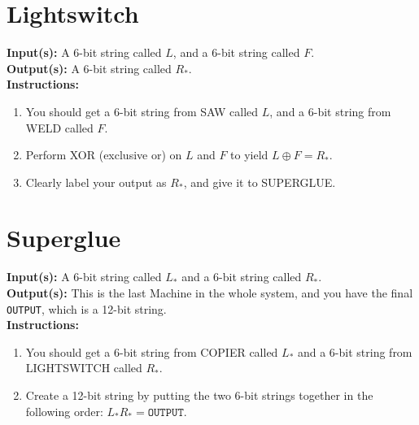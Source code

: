 \documentclass[12pt]{amsart}
\theoremstyle{plain}
\theoremstyle{definition}
\theoremstyle{remark}
\begin{document}
\newpage
\section*{Lightswitch}
\textbf{Input(s):}  A 6-bit string called $L$, and a 6-bit string called $F$.\\

\textbf{Output(s):} A 6-bit string called $R_*$.\\

\textbf{Instructions:}
\begin{enumerate}[1.]
	\item You should get a 6-bit string from SAW called $L$, and a 6-bit string from WELD called $F$.
	\item Perform XOR (exclusive or) on $L$ and $F$ to yield $L\oplus F = R_*$.
	\item Clearly label your output as $R_*$, and give it to SUPERGLUE.
\end{enumerate}

\newpage
\section*{Superglue}
\textbf{Input(s):}  A 6-bit string called $L_*$ and a 6-bit string called $R_*$.\\

\textbf{Output(s):} This is the last Machine in the whole system, and you have the final \texttt{OUTPUT}, which is a 12-bit string.\\

\textbf{Instructions:}
\begin{enumerate}[1.]
	\item You should get a 6-bit string from COPIER called $L_*$ and a 6-bit string from LIGHTSWITCH called $R_*$.
	\item Create a 12-bit string by putting the two 6-bit strings together in the following order: $L_*R_* = \texttt{OUTPUT}$.
\end{enumerate}
\end{document}
